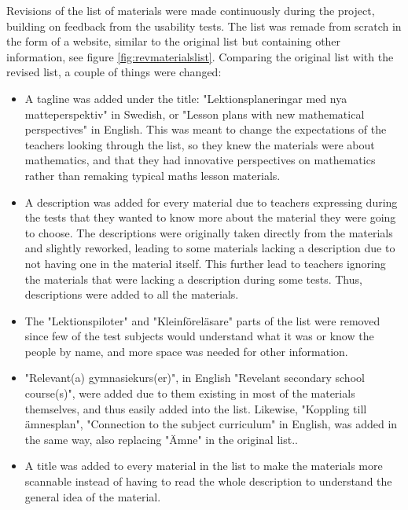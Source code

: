 Revisions of the list of materials were made continuously during the project, building on feedback from the usability tests. The list was remade from scratch in the form of a website, similar to the original list but containing other information, see figure \ref{fig:revmaterialslist}. Comparing the original list with the revised list, a couple of things were changed:
\begin{itemize}
	\item A tagline was added under the title: "Lektionsplaneringar med nya matteperspektiv" in Swedish, or "Lesson plans with new mathematical perspectives" in English. This was meant to change the expectations of the teachers looking through the list, so they knew the materials were about mathematics, and that they had innovative perspectives on mathematics rather than remaking typical maths lesson materials.
	\item A description was added for every material due to teachers expressing during the tests that they wanted to know more about the material they were going to choose. The descriptions were originally taken directly from the materials and slightly reworked, leading to some materials lacking a description due to not having one in the material itself. This further lead to teachers ignoring the materials that were lacking a description during some tests. Thus, descriptions were added to all the materials.
	\item The "Lektionspiloter" and "Kleinföreläsare" parts of the list were removed since few of the test subjects would understand what it was or know the people by name, and more space was needed for other information.
	\item "Relevant(a) gymnasiekurs(er)", in English "Revelant secondary school course(s)", were added due to them existing in most of the materials themselves, and thus easily added into the list. Likewise, "Koppling till ämnesplan", "Connection to the subject curriculum" in English, was added in the same way, also replacing "Ämne" in the original list..
	\item A title was added to every material in the list to make the materials more scannable instead of having to read the whole description to understand the general idea of the material.
\end{itemize}

